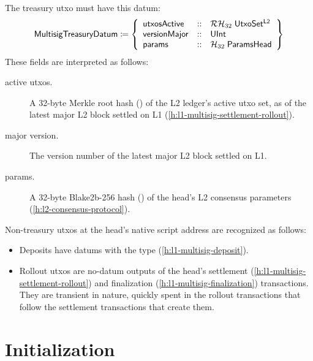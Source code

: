 \documentclass[../hydrozoa.tex]{subfiles}
\begin{document}
The treasury utxo must have this datum:
\begin{equation*}
  \mathsf{MultisigTreasuryDatum} \coloneq \left\{
    \begin{array}{lll}
      \mathsf{utxosActive}  &::& \mathcal{RH}_{32} \; \mathsf{UtxoSet^{L2}} \\
      \mathsf{versionMajor} &::& \mathsf{UInt} \\
      \mathsf{params} &::& \mathcal{H}_{32} \; \mathsf{ParamsHead}
    \end{array}\right\}
\end{equation*}
These fields are interpreted as follows:
\begin{description}
  \item[active utxos.] A 32-byte Merkle root hash () of the L2 ledger's active utxo set, as of the latest major L2 block settled on L1 (\cref{h:l1-multisig-settlement-rollout}).
  \item[major version.] The version number of the latest major L2 block settled on L1.
  \item[params.] A 32-byte Blake2b-256 hash () of the head's L2 consensus parameters (\cref{h:l2-consensus-protocol}).
\end{description}

Non-treasury utxos at the head's native script address are recognized as follows:
\begin{itemize}
  \item Deposits have datums with the  type (\cref{h:l1-multisig-deposit}).
  \item Rollout utxos are no-datum outputs of the head's settlement (\cref{h:l1-multisig-settlement-rollout}) and finalization (\cref{h:l1-multisig-finalization}) transactions.
    They are transient in nature, quickly spent in the rollout transactions that follow the settlement transactions that create them.
\end{itemize}
  
\section{Initialization}%
\label{h:l1-multisig-initialization}%
\end{document}
